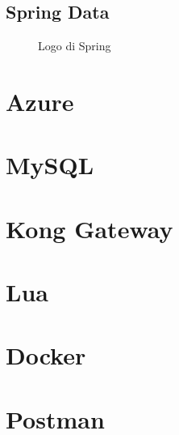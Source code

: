 \subsection{Spring Data}

\begin{figure}[ht]
	\centering
	\caption{Logo di Spring}
	\label{fig:one}
\end{figure}


\section{Azure}
\section{MySQL}
\section{Kong Gateway}
\section{Lua}
\section{Docker}
\section{Postman}

